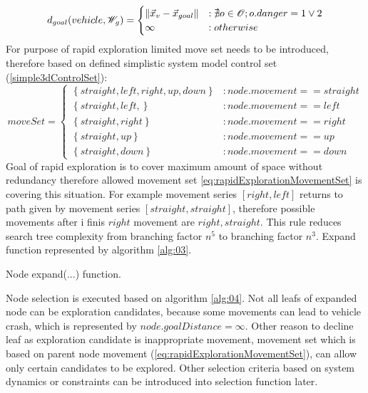 \begin{equation}\label{eq:distanceToGoalCalc}
    d_{goal}(vehicle,\mathscr{W}_g) = 
    \begin{cases}
        \left\lVert\vec{x}_v-\vec{x}_{goal}\right\rVert&:\nexists o \in \mathscr{O}; o.danger = 1 \vee 2\\
        \infty&:otherwise
    \end{cases}
\end{equation}
\noindent For purpose of rapid exploration limited move set needs to be introduced, therefore based on defined simplistic system model control set (\ref{simple3dControlSet}):
\begin{equation}\label{eq:rapidExplorationMovementSet}
    moveSet=
    \begin{cases}
        \left\{straight,left,right,up,down \right\} &: node.movement == straight\\
        \left\{straight,left, \right\} &: node.movement == left\\
        \left\{straight,right \right\} &: node.movement == right\\
        \left\{straight,up \right\} &: node.movement == up\\
        \left\{straight,down \right\} &: node.movement == down
    \end{cases}
\end{equation}
\noindent Goal of rapid exploration is to cover maximum amount of space without redundancy therefore allowed movement set \ref{eq:rapidExplorationMovementSet} is covering this situation. For example movement series $[right,left]$ returns to path given by movement series $[straight,straight]$, therefore possible movements after i finis $right$ movement are $right,straight$. This rule reduces search tree complexity from branching factor $n^5$ to branching factor $n^3$. Expand function represented by algorithm \ref{alg:03}.

\begin{algorithm}[H]
\caption{Node expand(...) function.}
\label{alg:03}
\end{algorithm}
\noindent Node selection is executed based on algorithm \ref{alg:04}. Not all leafs of expanded node can be exploration candidates, because some movements can lead to vehicle crash, which is represented by $node.goalDistance = \infty$. Other reason to decline leaf as exploration candidate is inappropriate movement, movement set which is based on parent node movement (\ref{eq:rapidExplorationMovementSet}), can allow only certain candidates to be explored. Other selection criteria based on system dynamics or constraints can be introduced into selection function later.

